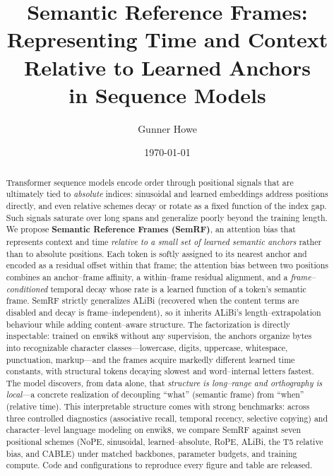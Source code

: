 \documentclass[11pt]{article}
\title{\textbf{Semantic Reference Frames:\\ Representing Time and Context Relative to Learned Anchors\\ in Sequence Models}}
\author[ ]{Gunner Howe}
\affil[ ]{\texttt{gunnerlevihowe@gmail.com}}
\date{\today}
\begin{document}
\maketitle

\begin{abstract}
Transformer sequence models encode order through positional signals that are
ultimately tied to \emph{absolute} indices: sinusoidal and learned embeddings
address positions directly, and even relative schemes decay or rotate as a fixed
function of the index gap. Such signals saturate over long spans and generalize
poorly beyond the training length. We propose \textbf{Semantic Reference Frames
(SemRF)}, an attention bias that represents context and time \emph{relative to a
small set of learned semantic anchors} rather than to absolute positions. Each
token is softly assigned to its nearest anchor and encoded as a residual offset
within that frame; the attention bias between two positions combines an
anchor--frame affinity, a within--frame residual alignment, and a
\emph{frame--conditioned} temporal decay whose rate is a learned function of a
token's semantic frame. SemRF strictly generalizes ALiBi \citep{press2022train}
(recovered when the content terms are disabled and decay is frame--independent),
so it inherits ALiBi's length--extrapolation behaviour while adding
content--aware structure. The factorization is directly inspectable: trained on
enwik8 without any supervision, the anchors organize bytes into recognizable
character classes---lowercase, digits, uppercase, whitespace, punctuation,
markup---and the frames acquire markedly different learned time constants, with
structural tokens decaying slowest and word--internal letters fastest. The model
discovers, from data alone, that \emph{structure is long--range and orthography
is local}---a concrete realization of decoupling ``what'' (semantic frame) from
``when'' (relative time). This interpretable structure comes with strong
benchmarks: across three controlled diagnostics (associative recall, temporal
recency, selective copying) and character--level language modeling on enwik8, we
compare SemRF against seven positional schemes (NoPE, sinusoidal,
learned--absolute, RoPE, ALiBi, the T5 relative bias, and CABLE) under matched
backbones, parameter budgets, and training compute. \resAbstractFindings{}
Code and configurations to reproduce every figure and table are released.
\end{abstract}

\end{document}
